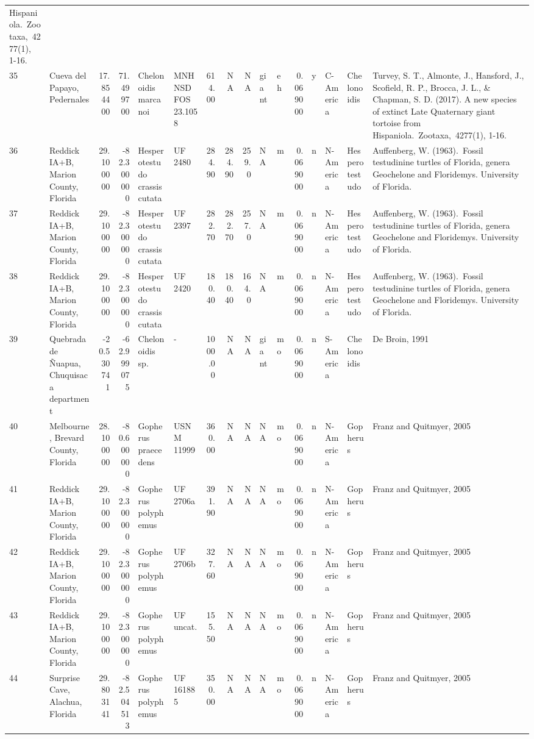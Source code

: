 \documentclass[]{article}
\begin{document}
\begin{longtable}[]{@{}llrrllrrrllrllll@{}}
Hispaniola.~Zootaxa,~4277(1), 1-16.\tabularnewline
35 & Cueva del Papayo, Pedernales & 17.854400 & 71.499700 & Chelonoidis
marcanoi & MNHNSD FOS 23.1058 & 614.00 & NA & NA & giant & eh & 0.069000
& y & C-America & Chelonoidis & Turvey, S. T., Almonte, J., Hansford,
J., Scofield, R. P., Brocca, J. L., \& Chapman, S. D. (2017). A new
species of extinct Late Quaternary giant tortoise from
Hispaniola.~Zootaxa,~4277(1), 1-16.\tabularnewline
36 & Reddick IA+B, Marion County, Florida & 29.100000 & -82.300000 &
Hesperotestudo crassiscutata & UF 2480 & 284.90 & 284.90 & 259.0 & NA &
m & 0.069000 & n & N-America & Hesperotestudo & Auffenberg, W.
(1963).~Fossil testudinine turtles of Florida, genera Geochelone and
Floridemys. University of Florida.\tabularnewline
37 & Reddick IA+B, Marion County, Florida & 29.100000 & -82.300000 &
Hesperotestudo crassiscutata & UF 2397 & 282.70 & 282.70 & 257.0 & NA &
m & 0.069000 & n & N-America & Hesperotestudo & Auffenberg, W.
(1963).~Fossil testudinine turtles of Florida, genera Geochelone and
Floridemys. University of Florida.\tabularnewline
38 & Reddick IA+B, Marion County, Florida & 29.100000 & -82.300000 &
Hesperotestudo crassiscutata & UF 2420 & 180.40 & 180.40 & 164.0 & NA &
m & 0.069000 & n & N-America & Hesperotestudo & Auffenberg, W.
(1963).~Fossil testudinine turtles of Florida, genera Geochelone and
Floridemys. University of Florida.\tabularnewline
39 & Quebrada de Ñuapua, Chuquisaca department & -20.530741 & -62.999075
& Chelonoidis sp. & - & 1000.00 & NA & NA & giant & mo & 0.069000 & n &
S-America & Chelonoidis & De Broin, 1991\tabularnewline
40 & Melbourne, Brevard County, Florida & 28.100000 & -80.600000 &
Gopherus praecedens & USNM 11999 & 360.00 & NA & NA & NA & mo & 0.069000
& n & N-America & Gopherus & Franz and Quitmyer, 2005\tabularnewline
41 & Reddick IA+B, Marion County, Florida & 29.100000 & -82.300000 &
Gopherus polyphemus & UF 2706a & 391.90 & NA & NA & NA & mo & 0.069000 &
n & N-America & Gopherus & Franz and Quitmyer, 2005\tabularnewline
42 & Reddick IA+B, Marion County, Florida & 29.100000 & -82.300000 &
Gopherus polyphemus & UF 2706b & 327.60 & NA & NA & NA & mo & 0.069000 &
n & N-America & Gopherus & Franz and Quitmyer, 2005\tabularnewline
43 & Reddick IA+B, Marion County, Florida & 29.100000 & -82.300000 &
Gopherus polyphemus & UF uncat. & 155.50 & NA & NA & NA & mo & 0.069000
& n & N-America & Gopherus & Franz and Quitmyer, 2005\tabularnewline
44 & Surprise Cave, Alachua, Florida & 29.803141 & -82.504513 & Gopherus
polyphemus & UF 161885 & 350.00 & NA & NA & NA & mo & 0.069000 & n &
N-America & Gopherus & Franz and Quitmyer, 2005\tabularnewline

\end{longtable}
\end{document}
